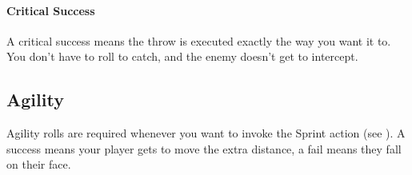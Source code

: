 \paragraph{Critical Success} A critical success means the throw is executed exactly the way you want it to.
You don't have to roll to catch, and the enemy doesn't get to intercept.

\subsection{Agility}
Agility rolls are required whenever you want to invoke the Sprint action (see ).
A success means your player gets to move the extra distance, a fail means they fall on their face.